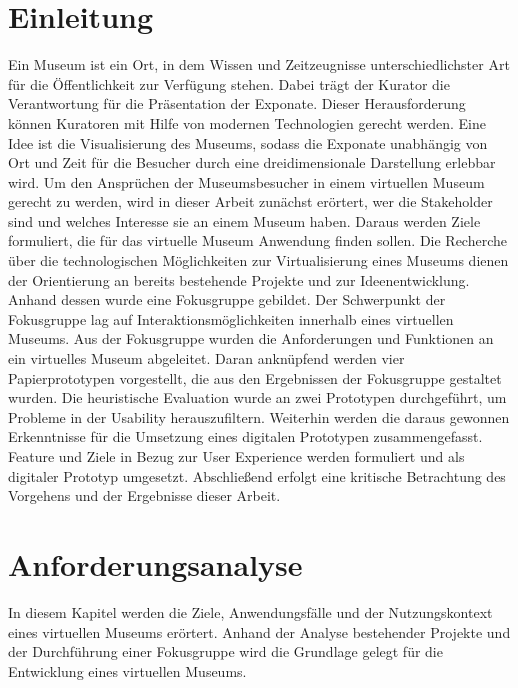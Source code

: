 \documentclass[runningheads,a4paper, 12pt]{llncs}
\begin{document}

\section{Einleitung}
Ein Museum ist ein Ort, in dem Wissen und Zeitzeugnisse unterschiedlichster Art für die Öffentlichkeit zur Verfügung stehen. Dabei trägt der Kurator die Verantwortung für die Präsentation der Exponate. Dieser Herausforderung können Kuratoren mit Hilfe von modernen Technologien gerecht werden. Eine Idee ist die Visualisierung des Museums, sodass die Exponate unabhängig von Ort und Zeit für die Besucher durch eine dreidimensionale Darstellung erlebbar wird. Um den Ansprüchen der Museumsbesucher in einem virtuellen Museum gerecht zu werden, wird in dieser Arbeit zunächst erörtert, wer die Stakeholder sind und welches Interesse sie an einem Museum haben. Daraus werden Ziele formuliert, die für das virtuelle Museum Anwendung finden sollen. Die Recherche über die technologischen Möglichkeiten zur Virtualisierung eines Museums dienen der Orientierung an bereits bestehende Projekte und zur Ideenentwicklung. Anhand dessen wurde eine Fokusgruppe gebildet. Der Schwerpunkt der Fokusgruppe lag auf Interaktionsmöglichkeiten innerhalb eines virtuellen Museums. Aus der Fokusgruppe wurden die Anforderungen und Funktionen an ein virtuelles Museum abgeleitet. Daran anknüpfend werden vier Papierprototypen vorgestellt, die aus den Ergebnissen der Fokusgruppe gestaltet wurden. Die heuristische Evaluation wurde an zwei Prototypen durchgeführt, um Probleme in der Usability herauszufiltern. Weiterhin werden die daraus gewonnen Erkenntnisse für die Umsetzung eines digitalen Prototypen zusammengefasst. Feature und Ziele in Bezug zur User Experience werden formuliert und als digitaler Prototyp umgesetzt. Abschließend erfolgt eine kritische Betrachtung des Vorgehens und der Ergebnisse dieser Arbeit.\\


\section{Anforderungsanalyse}
In diesem Kapitel werden die Ziele, Anwendungsfälle und der Nutzungskontext eines virtuellen Museums erörtert. Anhand der Analyse bestehender Projekte und der Durchführung einer Fokusgruppe wird die Grundlage gelegt für die Entwicklung eines virtuellen Museums.\\
\end{document}
